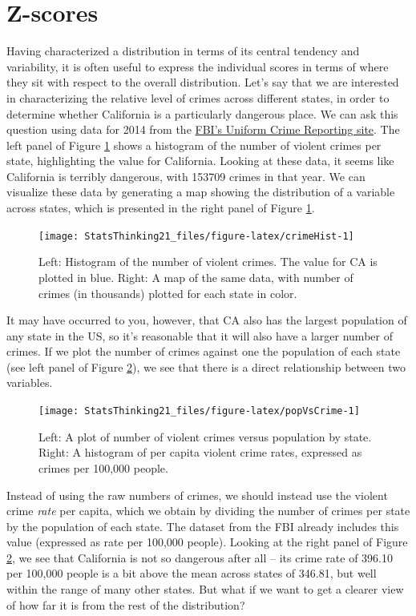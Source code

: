 \documentclass[
  12pt,
]{book}
\begin{document}
\hypertarget{z-scores}{%
\section{Z-scores}\label{z-scores}}

Having characterized a distribution in terms of its central tendency and variability, it is often useful to express the individual scores in terms of where they sit with respect to the overall distribution. Let's say that we are interested in characterizing the relative level of crimes across different states, in order to determine whether California is a particularly dangerous place. We can ask this question using data for 2014 from the \href{https://www.ucrdatatool.gov/Search/Crime/State/RunCrimeOneYearofData.cfm}{FBI's Uniform Crime Reporting site}. The left panel of Figure \ref{fig:crimeHist} shows a histogram of the number of violent crimes per state, highlighting the value for California. Looking at these data, it seems like California is terribly dangerous, with 153709 crimes in that year. We can visualize these data by generating a map showing the distribution of a variable across states, which is presented in the right panel of Figure \ref{fig:crimeHist}.

\begin{figure}
\texttt{[image: StatsThinking21\_files/figure-latex/crimeHist-1]} \caption{Left: Histogram of the number of violent crimes.  The value for CA is plotted in blue. Right: A map of the same data, with number of crimes (in thousands) plotted for each state in color.}\label{fig:crimeHist}
\end{figure}

It may have occurred to you, however, that CA also has the largest population of any state in the US, so it's reasonable that it will also have a larger number of crimes. If we plot the number of crimes against one the population of each state (see left panel of Figure \ref{fig:popVsCrime}), we see that there is a direct relationship between two variables.

\begin{figure}
\texttt{[image: StatsThinking21\_files/figure-latex/popVsCrime-1]} \caption{Left: A plot of number of violent crimes versus population by state. Right: A histogram of per capita violent crime rates, expressed as crimes per 100,000 people.}\label{fig:popVsCrime}
\end{figure}

Instead of using the raw numbers of crimes, we should instead use the violent crime \emph{rate} per capita, which we obtain by dividing the number of crimes per state by the population of each state. The dataset from the FBI already includes this value (expressed as rate per 100,000 people). Looking at the right panel of Figure \ref{fig:popVsCrime}, we see that California is not so dangerous after all -- its crime rate of 396.10 per 100,000 people is a bit above the mean across states of 346.81, but well within the range of many other states. But what if we want to get a clearer view of how far it is from the rest of the distribution?
\end{document}
